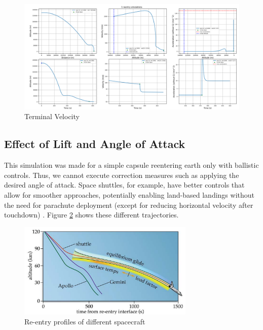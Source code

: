 \documentclass[runningheads]{llncs}
\begin{document}
\begin{figure}
\centering
\includegraphics[width=1\textwidth]{images/forces_equilibrium_metrics.png}
\caption{Terminal Velocity} \label{forces_equilibrium}
\end{figure}







\subsection{Effect of Lift and Angle of Attack}
This simulation was made for a simple capsule reentering earth only with ballistic controls. Thus, we cannot execute correction measures such as applying the desired angle of attack. Space shuttles, for example, have better controls that allow for smoother approaches, potentially enabling land-based landings without the need for parachute deployment (except for reducing horizontal velocity after touchdown) \cite{miguel_optimal_reentry_control}. Figure \ref{attack_angle_trajectories} shows these different trajectories.

\begin{figure}[ht]
    \centering
    \includegraphics[width=0.75\textwidth]{images/attack_angle_trajectories.png}
    \caption{Re-entry profiles of different spacecraft \cite{returning_space}} \label{attack_angle_trajectories}
\end{figure}
\end{document}
